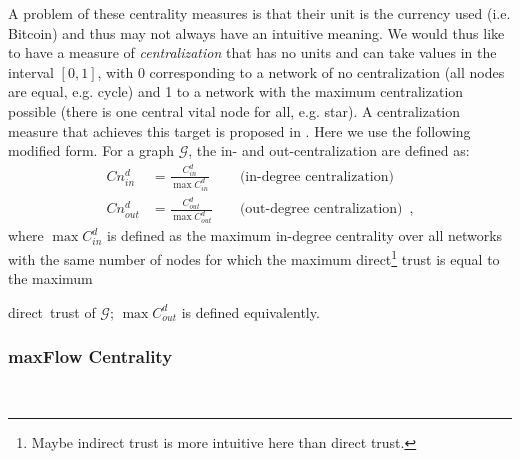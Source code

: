     A problem of these centrality measures is that their unit is the currency used (i.e. Bitcoin) and thus may not always have
    an intuitive meaning. We would thus like to have a measure of \textit{centralization} that has no units and can take
    values in the interval $\left[0,1\right]$, with 0 corresponding to a network of no centralization (all nodes are equal,
    e.g.  cycle) and 1 to a network with the maximum centralization possible (there is one central vital node for all, e.g.
    star). A centralization measure that achieves this target is proposed in \cite{freeman}. Here we use the following
    modified form. For a graph $\mathcal{G}$, the in- and out-centralization are defined as:
    \begin{align*}
      Cn^d_{in} &= \frac{C^d_{in}}{\max C^d_{in}} && \mbox{ (in-degree centralization)} \\
      Cn^d_{out} &= \frac{C^d_{out}}{\max C^d_{out}} && \mbox{ (out-degree centralization)} \enspace,
    \end{align*}
    where $\max C^d_{in}$ is defined as the maximum in-degree centrality over all networks with the same number of nodes for
    which the maximum direct\footnote{Maybe indirect trust is more intuitive here than direct trust.} trust is equal to the
    maximum \addtocounter{footnote}{-1}direct\footnotemark \ trust of $\mathcal{G}$; $\max C^d_{out}$ is defined equivalently.

  \subsubsection{maxFlow Centrality} \ \\

